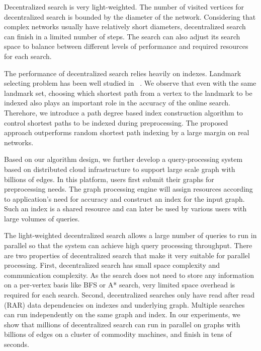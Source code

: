 Decentralized search is very light-weighted. The number of visited vertices for decentralized search is bounded by the diameter of the network. Considering that complex networks usually have relatively short diameters, decentralized search can finish in a limited number of steps. The search can also adjust its search space to balance between different levels of performance and required resources for each search. %

The performance of decentralized search relies heavily on indexes. Landmark selecting problem has been well studied in ~\cite{Potamias:2009:FSP:1645953.1646063,6927522}. We observe that even with the same landmark set, choosing which shortest path from a vertex to the landmark to be indexed also plays an important role in the accuracy of the online search. %
Therehore, we introduce a path degree based index construction algorithm to control shortest paths to be indexed during preprocessing. The proposed approach outperforms random shortest path indexing by a large margin on real networks.

Based on our algorithm design, we further develop a query-processing system based on distributed cloud infrastructure to support large scale graph with billions of edges. In this platform, users first submit their graphs for preprocessing needs. The graph processing engine will assign resources according to application's need for accuracy and construct an index for the input graph. Such an index is a shared resource and can later be used by various users with large volumes of queries.

The light-weighted decentralized search allows a large number of queries to run in parallel so that the system can achieve high query processing throughput. There are two properties of decentralized search that make it very suitable for parallel processing. First, decentralized search has small space complexity and communication complexity. As the search does not need to store any information on a per-vertex basis like BFS or A* search, very limited space overhead is required for each search. Second, decentralized searches only have read after read (RAR) data dependencies on indexes and underlying graph. Multiple searches can run independently on the same graph and index. 
In our experiments, we show that millions of decentralized search can run in parallel on graphs with billions of edges on a cluster of commodity machines, and finish in tens of seconds.

